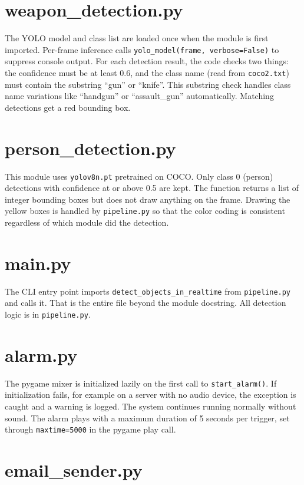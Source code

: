 \documentclass[12pt,a4paper]{report}
\begin{document}
\section{weapon\_detection.py}

The YOLO model and class list are loaded once when the module is first imported. Per-frame inference calls \texttt{yolo\_model(frame, verbose=False)} to suppress console output. For each detection result, the code checks two things: the confidence must be at least 0.6, and the class name (read from \texttt{coco2.txt}) must contain the substring ``gun'' or ``knife''. This substring check handles class name variations like ``handgun'' or ``assault\_gun'' automatically. Matching detections get a red bounding box.

\section{person\_detection.py}

This module uses \texttt{yolov8n.pt} pretrained on COCO. Only class 0 (person) detections with confidence at or above 0.5 are kept. The function returns a list of integer bounding boxes but does not draw anything on the frame. Drawing the yellow boxes is handled by \texttt{pipeline.py} so that the color coding is consistent regardless of which module did the detection.

\section{main.py}

The CLI entry point imports \texttt{detect\_objects\_in\_realtime} from \texttt{pipeline.py} and calls it. That is the entire file beyond the module docstring. All detection logic is in \texttt{pipeline.py}.

\section{alarm.py}

The pygame mixer is initialized lazily on the first call to \texttt{start\_alarm()}. If initialization fails, for example on a server with no audio device, the exception is caught and a warning is logged. The system continues running normally without sound. The alarm plays with a maximum duration of 5 seconds per trigger, set through \texttt{maxtime=5000} in the pygame play call.

\section{email\_sender.py}
\end{document}
